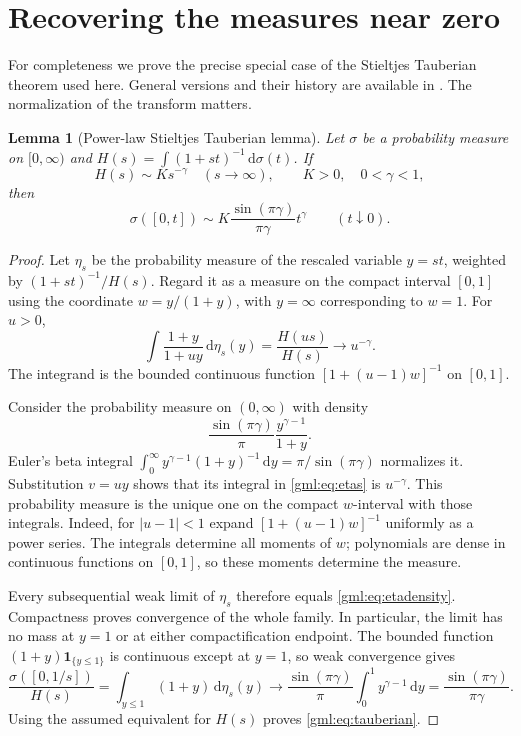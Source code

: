 \documentclass[11pt]{article}
\numberwithin{equation}{section}
\newtheorem{lemma}[theorem]{Lemma}
\theoremstyle{definition}
\theoremstyle{remark}
\newcommand{\dd}{\,\mathrm d}
\begin{document}
\section{Recovering the measures near zero}\label{gml:sec:tauberian}
For completeness we prove the precise special case of the Stieltjes
Tauberian theorem used here. General versions and their history are
available in \cite{langer}. The normalization of the transform matters.

\begin{lemma}[Power-law Stieltjes Tauberian lemma]\label{gml:lem:tauberian}
Let $\sigma$ be a probability measure on $[0,\infty)$ and
$H(s)=\int(1+st)^{-1}\dd\sigma(t)$. If
\[
 H(s)\sim K s^{-\gamma}\quad(s\to\infty),\qquad
 K>0,\quad0<\gamma<1,
\]
then
\begin{equation}\label{gml:eq:tauberian}
 \sigma([0,t])\sim
 K\frac{\sin(\pi\gamma)}{\pi\gamma}t^\gamma
 \qquad(t\downarrow0).
\end{equation}
\end{lemma}
\begin{proof}
Let $\eta_s$ be the probability measure of the rescaled variable $y=st$,
weighted by $(1+st)^{-1}/H(s)$. Regard it as a measure on the compact
interval $[0,1]$ using the coordinate $w=y/(1+y)$, with $y=\infty$
corresponding to $w=1$. For $u>0$,
\begin{equation}\label{gml:eq:etas}
 \int\frac{1+y}{1+uy}\dd\eta_s(y)
   =\frac{H(us)}{H(s)}\longrightarrow u^{-\gamma}.
\end{equation}
The integrand is the bounded continuous function
$[1+(u-1)w]^{-1}$ on $[0,1]$.

Consider the probability measure on $(0,\infty)$ with density
\begin{equation}\label{gml:eq:etadensity}
 \frac{\sin(\pi\gamma)}\pi\frac{y^{\gamma-1}}{1+y}.
\end{equation}
Euler's beta integral
$\int_0^\infty y^{\gamma-1}(1+y)^{-1}\dd y=\pi/\sin(\pi\gamma)$
normalizes it. Substitution $v=uy$ shows that its integral in
\eqref{gml:eq:etas} is $u^{-\gamma}$. This probability measure is the unique
one on the compact $w$-interval with those integrals. Indeed, for
$|u-1|<1$ expand $[1+(u-1)w]^{-1}$ uniformly as a power series. The
integrals determine all moments of $w$; polynomials are dense in
continuous functions on $[0,1]$, so these moments determine the measure.

Every subsequential weak limit of $\eta_s$ therefore equals
\eqref{gml:eq:etadensity}. Compactness proves convergence of the whole family.
In particular, the limit has no mass at $y=1$ or at either compactification
endpoint. The bounded function $(1+y)\mathbf1_{\{y\le1\}}$ is continuous
except at $y=1$, so weak convergence gives
\[
 \frac{\sigma([0,1/s])}{H(s)}
 =\int_{y\le1}(1+y)\dd\eta_s(y)
 \longrightarrow\frac{\sin(\pi\gamma)}\pi
                   \int_0^1y^{\gamma-1}\dd y
 =\frac{\sin(\pi\gamma)}{\pi\gamma}.
\]
Using the assumed equivalent for $H(s)$ proves \eqref{gml:eq:tauberian}.
\end{proof}
\end{document}
